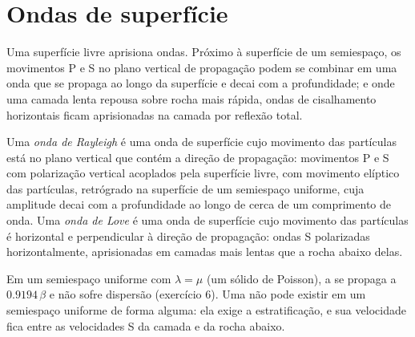 \section{Ondas de superfície}

Uma superfície livre aprisiona ondas. Próximo à superfície de um semiespaço, os movimentos P e S
no plano vertical de propagação podem se combinar em uma onda que se propaga ao longo da
superfície e decai com a profundidade; e onde uma camada lenta repousa sobre rocha mais rápida,
ondas de cisalhamento horizontais ficam aprisionadas na camada por reflexão total.

\begin{definition}\label{def:b3:seismology-imaging:surface-waves}
Uma \emph{onda de Rayleigh} é uma onda de superfície cujo movimento
das partículas está no plano vertical que contém a direção de propagação: movimentos
P e S com polarização vertical acoplados pela superfície livre, com movimento elíptico
das partículas, retrógrado na superfície de um semiespaço uniforme, cuja amplitude decai
com a profundidade ao longo de cerca de um comprimento de onda. Uma \emph{onda de
Love} é uma onda de superfície cujo movimento das partículas é horizontal
e perpendicular à direção de propagação: ondas S polarizadas horizontalmente, aprisionadas
em camadas mais lentas que a rocha abaixo delas.
\end{definition}

Em um semiespaço uniforme com $\lambda = \mu$ (um sólido de Poisson), a  se propaga a $0.9194\,\beta$ e não sofre dispersão (exercício 6). Uma  não pode existir em um semiespaço uniforme de forma alguma: ela exige a estratificação,
e sua velocidade fica entre as velocidades S da camada e da rocha abaixo.

